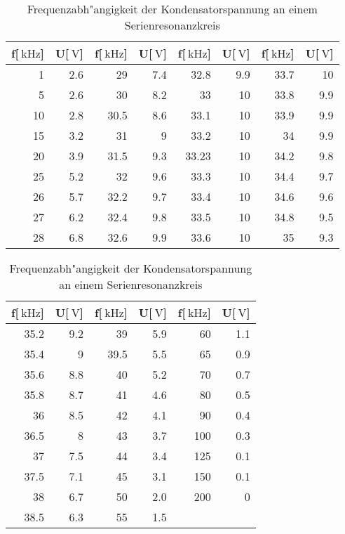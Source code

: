 \begin{table}
\begin{center}
\begin{tabular}{r|r|r|r|r|r|r|r}
f[$\SI{}{\kilo\hertz}$] & U[$\SI{}{\volt}$] & f[$\SI{}{\kilo\hertz}$] & U[$\SI{}{\volt}$] & f[$\SI{}{\kilo\hertz}$] & U[$\SI{}{\volt}$] & f[$\SI{}{\kilo\hertz}$] & U[$\SI{}{\volt}$] \\
\hline
1 & 2.6 & 29 & 7.4 & 32.8 & 9.9 & 33.7 & 10 \\
5 & 2.6 & 30 & 8.2 & 33 & 10 & 33.8 & 9.9 \\
10 & 2.8 & 30.5 & 8.6 & 33.1 & 10 & 33.9 & 9.9 \\
15 & 3.2 & 31 & 9 & 33.2 & 10 & 34 & 9.9 \\
20 & 3.9 & 31.5 & 9.3 & 33.23 & 10 & 34.2 & 9.8 \\
25 & 5.2 & 32 & 9.6 & 33.3 & 10 & 34.4 & 9.7 \\
26 & 5.7 & 32.2 & 9.7 & 33.4 & 10 & 34.6 & 9.6 \\
27 & 6.2 & 32.4 & 9.8 & 33.5 & 10 & 34.8 & 9.5 \\
28 & 6.8 & 32.6 & 9.9 & 33.6 & 10 & 35 & 9.3 \\
\end{tabular}
\end{center}
\begin{center}
\begin{tabular}{r|r|r|r|r|r}
f[$\SI{}{\kilo\hertz}$] & U[$\SI{}{\volt}$] & f[$\SI{}{\kilo\hertz}$] & U[$\SI{}{\volt}$] & f[$\SI{}{\kilo\hertz}$] & U[$\SI{}{\volt}$] \\
\hline
35.2 & 9.2 & 39 & 5.9 & 60 & 1.1 \\
35.4 & 9 & 39.5 & 5.5 & 65 & 0.9 \\
35.6 & 8.8 & 40 & 5.2 & 70 & 0.7 \\
35.8 & 8.7 & 41 & 4.6 & 80 & 0.5 \\
36 & 8.5 & 42 & 4.1 & 90 & 0.4 \\
36.5 & 8 & 43 & 3.7 & 100 & 0.3 \\
37 & 7.5 & 44 & 3.4 & 125 & 0.1 \\
37.5 & 7.1 & 45 & 3.1 & 150 & 0.1 \\
38 & 6.7 & 50 & 2.0 & 200 & 0 \\
38.5 & 6.3 & 55 & 1.5 \\
\end{tabular}
\caption[Messwerte zu Aufgabenteil c]{Frequenzabh"angigkeit der Kondensatorspannung an einem Serienresonanzkreis}
\label{frequenz}
\end{center}
\end{table}
